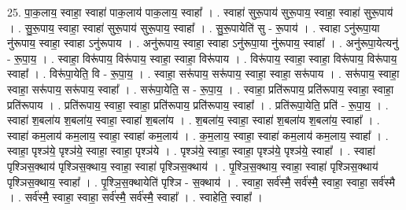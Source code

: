 \documentclass[17pt]{extarticle}
\begin{document}
25. पा॒क॒लाय॒ स्वाहा॒ स्वाहा॑ पाक॒लाय॑ पाक॒लाय॒ स्वाहा᳚ । . स्वाहा॑ सुरू॒पाय॑ सुरू॒पाय॒ स्वाहा॒ स्वाहा॑ सुरू॒पाय॑ । . सु॒रू॒पाय॒ स्वाहा॒ स्वाहा॑ सुरू॒पाय॑ सुरू॒पाय॒ स्वाहा᳚ । . सु॒रू॒पायेति॑ सु - रू॒पाय॑ । . स्वाहा ऽनु॑रूपा॒या नु॑रूपाय॒ स्वाहा॒ स्वाहा ऽनु॑रूपाय । . अनु॑रूपाय॒ स्वाहा॒ स्वाहा ऽनु॑रूपा॒या नु॑रूपाय॒ स्वाहा᳚ । . अनु॑रूपा॒येत्यनु॑ - रू॒पा॒य॒ । . स्वाहा॒ विरू॑पाय॒ विरू॑पाय॒ स्वाहा॒ स्वाहा॒ विरू॑पाय । . विरू॑पाय॒ स्वाहा॒ स्वाहा॒ विरू॑पाय॒ विरू॑पाय॒ स्वाहा᳚ । . विरू॑पा॒येति॒ वि - रू॒पा॒य॒ । . स्वाहा॒ सरू॑पाय॒ सरू॑पाय॒ स्वाहा॒ स्वाहा॒ सरू॑पाय । . सरू॑पाय॒ स्वाहा॒ स्वाहा॒ सरू॑पाय॒ सरू॑पाय॒ स्वाहा᳚ । . सरू॑पा॒येति॒ स - रू॒पा॒य॒ । . स्वाहा॒ प्रति॑रूपाय॒ प्रति॑रूपाय॒ स्वाहा॒ स्वाहा॒ प्रति॑रूपाय । . प्रति॑रूपाय॒ स्वाहा॒ स्वाहा॒ प्रति॑रूपाय॒ प्रति॑रूपाय॒ स्वाहा᳚ । . प्रति॑रूपा॒येति॒ प्रति॑ - रू॒पा॒य॒ । . स्वाहा॑ श॒बला॑य श॒बला॑य॒ स्वाहा॒ स्वाहा॑ श॒बला॑य । . श॒बला॑य॒ स्वाहा॒ स्वाहा॑ श॒बला॑य श॒बला॑य॒ स्वाहा᳚ । . स्वाहा॑ कम॒लाय॑ कम॒लाय॒ स्वाहा॒ स्वाहा॑ कम॒लाय॑ । . क॒म॒लाय॒ स्वाहा॒ स्वाहा॑ कम॒लाय॑ कम॒लाय॒ स्वाहा᳚ । . स्वाहा॒ पृश्ञ॑ये॒ पृश्ञ॑ये॒ स्वाहा॒ स्वाहा॒ पृश्ञ॑ये । . पृश्ञ॑ये॒ स्वाहा॒ स्वाहा॒ पृश्ञ॑ये॒ पृश्ञ॑ये॒ स्वाहा᳚ । . स्वाहा॑ पृश्ञिस॒क्थाय॑ पृश्ञिस॒क्थाय॒ स्वाहा॒ स्वाहा॑ पृश्ञिस॒क्थाय॑ । . पृ॒श्ञि॒स॒क्थाय॒ स्वाहा॒ स्वाहा॑ पृश्ञिस॒क्थाय॑ पृश्ञिस॒क्थाय॒ स्वाहा᳚ । . पृ॒श्ञि॒स॒क्थायेति॑ पृश्ञि - स॒क्थाय॑ । . स्वाहा॒ सर्व॑स्मै॒ सर्व॑स्मै॒ स्वाहा॒ स्वाहा॒ सर्व॑स्मै । . सर्व॑स्मै॒ स्वाहा॒ स्वाहा॒ सर्व॑स्मै॒ सर्व॑स्मै॒ स्वाहा᳚ । . स्वाहेति॒ स्वाहा᳚ । \newline
\end{document}
